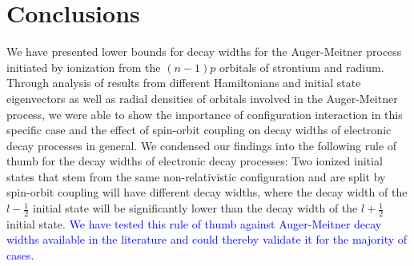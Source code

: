 \section{Conclusions}
\label{section:conclusions}

We have presented lower bounds for
decay widths for the Auger-Meitner process initiated by
ionization from the $(n-1)p$ orbitals of strontium and radium.
Through analysis of results from different Hamiltonians and initial state
eigenvectors as well as radial densities of orbitals involved in the
Auger-Meitner process, we were able to show the importance of configuration interaction
in this specific case and the effect of spin-orbit coupling on decay widths
of electronic decay processes in general.
We condensed our findings into the following rule of thumb for the decay widths
of electronic decay processes:
Two ionized initial states that stem from the same non-relativistic configuration and
are split by spin-orbit coupling will have different decay widths, where the decay width
of the $l-\frac12$ initial state will be significantly lower than the decay width of
the $l + \frac12$ initial state.
\textcolor{blue}
{We have tested this rule of thumb against Auger-Meitner decay widths available in the
literature and could thereby validate it for the majority
of cases.}
